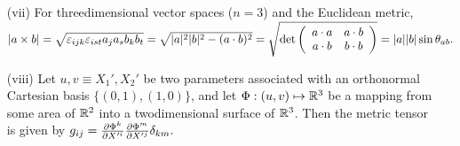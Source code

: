 \begin{itemize}
\item[(vii)]
For threedimensional vector spaces ($n=3$) and the Euclidean metric,\\
$\vert a\times b \vert=
\sqrt{\varepsilon_{ijk}\varepsilon_{ist}a_ja_sb_kb_t}  =
\sqrt{\vert a\vert^2
\vert b\vert^2
-(a\cdot b)^2}=\sqrt{{\rm det}
\left(
\begin{array}{cc}
a\cdot a&a\cdot b\\
a\cdot b&b\cdot b
\end{array}\right)}= \vert a\vert
\vert b\vert \sin \theta_{ab}.$
\item[(viii)]
Let $u,v\equiv X_1',X_2'$ be two parameters associated with an
orthonormal Cartesian basis $\{(0,1),(1,0)\}$, and let
$\Phi :(u,v)\mapsto {\Bbb R}^3$
be a mapping from some area of ${\Bbb R}^2$ into a twodimensional
surface of ${\Bbb R}^3$. Then the metric tensor is given by
$g_{ij}=
{\partial \Phi^k \over \partial X'^i}
{\partial \Phi^m \over \partial X'^j} \delta_{km}.$

\end{itemize}







